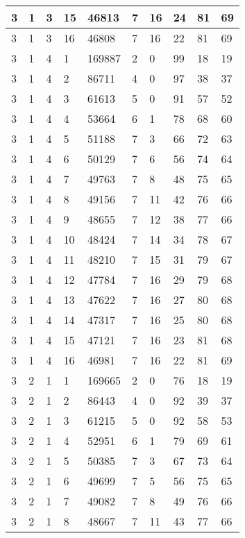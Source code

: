 \begin{table}[!ht]
\begin{tabular}{|l|l|l|l|l|l|l|l|l|l|}
        3 & 1 & 3 & 15 & 46813 & 7 & 16 & 24 & 81 & 69 \\ \hline
        3 & 1 & 3 & 16 & 46808 & 7 & 16 & 22 & 81 & 69 \\ \hline
        3 & 1 & 4 & 1 & 169887 & 2 & 0 & 99 & 18 & 19 \\ \hline
        3 & 1 & 4 & 2 & 86711 & 4 & 0 & 97 & 38 & 37 \\ \hline
        3 & 1 & 4 & 3 & 61613 & 5 & 0 & 91 & 57 & 52 \\ \hline
        3 & 1 & 4 & 4 & 53664 & 6 & 1 & 78 & 68 & 60 \\ \hline
        3 & 1 & 4 & 5 & 51188 & 7 & 3 & 66 & 72 & 63 \\ \hline
        3 & 1 & 4 & 6 & 50129 & 7 & 6 & 56 & 74 & 64 \\ \hline
        3 & 1 & 4 & 7 & 49763 & 7 & 8 & 48 & 75 & 65 \\ \hline
        3 & 1 & 4 & 8 & 49156 & 7 & 11 & 42 & 76 & 66 \\ \hline
        3 & 1 & 4 & 9 & 48655 & 7 & 12 & 38 & 77 & 66 \\ \hline
        3 & 1 & 4 & 10 & 48424 & 7 & 14 & 34 & 78 & 67 \\ \hline
        3 & 1 & 4 & 11 & 48210 & 7 & 15 & 31 & 79 & 67 \\ \hline
        3 & 1 & 4 & 12 & 47784 & 7 & 16 & 29 & 79 & 68 \\ \hline
        3 & 1 & 4 & 13 & 47622 & 7 & 16 & 27 & 80 & 68 \\ \hline
        3 & 1 & 4 & 14 & 47317 & 7 & 16 & 25 & 80 & 68 \\ \hline
        3 & 1 & 4 & 15 & 47121 & 7 & 16 & 23 & 81 & 68 \\ \hline
        3 & 1 & 4 & 16 & 46981 & 7 & 16 & 22 & 81 & 69 \\ \hline
        3 & 2 & 1 & 1 & 169665 & 2 & 0 & 76 & 18 & 19 \\ \hline
        3 & 2 & 1 & 2 & 86443 & 4 & 0 & 92 & 39 & 37 \\ \hline
        3 & 2 & 1 & 3 & 61215 & 5 & 0 & 92 & 58 & 53 \\ \hline
        3 & 2 & 1 & 4 & 52951 & 6 & 1 & 79 & 69 & 61 \\ \hline
        3 & 2 & 1 & 5 & 50385 & 7 & 3 & 67 & 73 & 64 \\ \hline
        3 & 2 & 1 & 6 & 49699 & 7 & 5 & 56 & 75 & 65 \\ \hline
        3 & 2 & 1 & 7 & 49082 & 7 & 8 & 49 & 76 & 66 \\ \hline
        3 & 2 & 1 & 8 & 48667 & 7 & 11 & 43 & 77 & 66 \\ \hline

\end{tabular}
\end{table}
